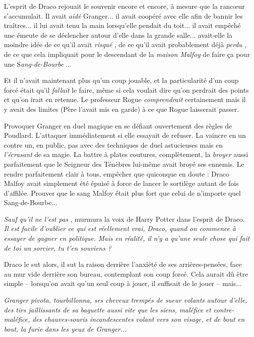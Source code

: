 L'esprit de Draco rejouait le souvenir encore et encore, à mesure que la rancœur s'accumulait. Il avait \emph{aidé}  Granger... il avait coopéré avec elle afin de bannir les traîtres... il lui avait tenu la main lorsqu'elle pendait du toit... il avait empêché une émeute de se déclencher autour d'elle dans la grande salle... avait-elle la moindre idée de ce qu'il avait \emph{risqué} , de ce qu'il avait probablement déjà \emph{perdu} , de ce que cela impliquait pour le descendant de la \emph{maison Malfoy}  de faire ça pour une S\emph{ang-de-Bourbe} ...

Et il n'avait maintenant plus qu'un coup jouable, et la particularité d'un coup forcé était qu'il \emph{fallait}  le faire, même si cela voulait dire qu'on perdrait des points et qu'on irait en retenue. Le professeur Rogue \emph{comprendrait}  certainement mais il y avait des limites (Père l'avait mis en garde) à ce que Rogue laisserait passer.

Provoquer Granger en duel magique en se défiant ouvertement des règles de Poudlard. L'attaquer immédiatement si elle essayait de refuser. La vaincre en un contre un, en public, pas avec des techniques de duel astucieuses mais en \emph{l'écrasant}  de sa magie. La battre à plates coutures, complètement, la \emph{broyer}  aussi parfaitement que le Seigneur des Ténèbres lui-même avait broyé ses ennemis. Le rendre parfaitement clair à tous, empêcher que quiconque en doute : Draco Malfoy avait simplement été épuisé à force de lancer le sortilège autant de fois d'affilée. Prouver que le sang Malfoy était plus fort que celui de n'importe quel Sang-de-Bourbe...

\emph{Sauf qu'il ne l'est pas} , murmura la voix de Harry Potter dans l'esprit de Draco. \emph{Il est facile d'oublier ce qui est réellement vrai, Draco, quand on commence à essayer de gagner en politique. Mais en réalité, il n'y a qu'une seule chose qui fait de toi un sorcier, tu t'en souviens ?} 

Draco le sut alors, il sut la raison derrière l'anxiété de ses arrières-pensées, face au mur vide derrière son bureau, contemplant son coup forcé. Cela aurait dû être simple – lorsqu'on avait qu'un seul coup à jouer, il suffisait de le jouer – mais...

\emph{Granger pivota, tourbillonna, ses cheveux trempés de sueur volants autour d'elle, des tirs jaillissants de sa baguette aussi vite que les siens, maléfice et contre-maléfice, des chauves-souris incandescentes volant vers son visage, et de bout en bout, la furie dans les yeux de Granger...} 

